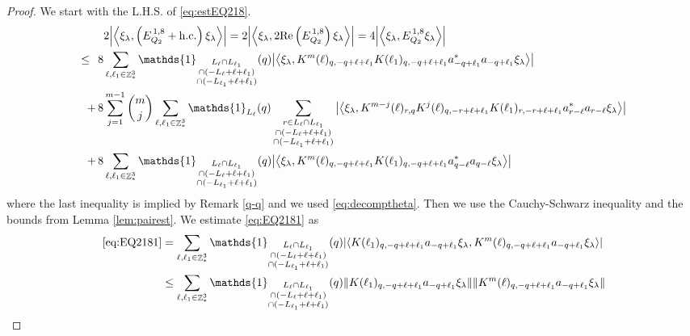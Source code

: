 \documentclass[12pt,a4paper]{article}
\numberwithin{equation}{section}
\newcommand{\1}{\mathbb{I}}
\DeclareMathOperator{\Z}{\mathbb{Z}}
\newcommand{\eva}[1]{\left\langle #1 \right\rangle}
\theoremstyle{plain}
\theoremstyle{definition}
\theoremstyle{remark}
\theoremstyle{plain}
\theoremstyle{definition}
\theoremstyle{remark}
\begin{document}
\begin{proof}
 We start with the L.H.S. of \eqref{eq:estEQ218}.
\begin{align}
	&2\abs{\eva{\xi_\lambda,\left(E^{\,1,8}_{Q_2}+\mathrm{h.c.}\right) \xi_\lambda }} = 2\abs{\eva{\xi_\lambda,2\mathrm{Re}\left(E^{\,1,8}_{Q_2}\right) \xi_\lambda }} = 4\abs{\eva{\xi_\lambda, E^{\,1,8}_{Q_2} \xi_\lambda }}\nonumber\\
	\leq\,\;8& \sum\limits_{\ell, \ell_1\in \Z^3_*} \mathds{1}_{\substack{L_{\ell}\cap L_{\ell_1}\\\cap (-L_{\ell}+\ell+\ell_1) \\ \cap (-L_{\ell_1}+\ell+\ell_1)}}(q) \abs{\eva{\xi_\lambda, K^m(\ell)_{q,-q+\ell+\ell_1} K(\ell_1)_{q,-q+\ell+\ell_1} a^*_{-q+\ell_1}a_{-q+\ell_1} \xi_\lambda }} \label{eq:EQ2181}\\
	+\,8& \sum\limits_{j=1}^{m-1} {{m}\choose j} \sum\limits_{\ell, \ell_1\in \Z^3_*}\mathds{1}_{L_{\ell}}(q) \sum\limits_{\substack{r\in L_{\ell} \cap L_{\ell_1}\\\cap (-L_{\ell}+\ell+\ell_1) \\ \cap (-L_{\ell_1}+\ell+\ell_1)}}  \abs{\eva{\xi_\lambda, K^{m-j}(\ell)_{r,q} K^j(\ell)_{q,-r+\ell+\ell_1} K(\ell_1)_{r,-r+\ell+\ell_1} a^*_{r-\ell}a_{r-\ell} \xi_\lambda }} \label{eq:EQ2182}\\
	+\,8&\sum\limits_{\ell, \ell_1\in \Z^3_*} \mathds{1}_{\substack{L_{\ell}\cap L_{\ell_1}\\\cap (-L_{\ell}+\ell+\ell_1) \\ \cap (-L_{\ell_1}+\ell+\ell_1)}} (q) \abs{\eva{\xi_\lambda, K^m(\ell)_{q,-q+\ell+\ell_1}K(\ell_1)_{q,-q+\ell+\ell_1} a^*_{q-\ell}a_{q-\ell}\xi_\lambda }} \label{eq:EQ2183}
\end{align}
where the last inequality is implied by Remark \ref{q-q} and we used \eqref{eq:decomptheta}. Then we use the Cauchy-Schwarz inequality and the bounds from Lemma \ref{lem:pairest}.
We estimate \eqref{eq:EQ2181} as 
\begin{align}
	 \eqref{eq:EQ2181}
	&= \sum\limits_{\ell, \ell_1\in \Z^3_*} \mathds{1}_{\substack{L_{\ell}\cap L_{\ell_1}\\\cap (-L_{\ell}+\ell+\ell_1) \\ \cap (-L_{\ell_1}+\ell+\ell_1)}}(q) \abs{\eva{ K(\ell_1)_{q,-q+\ell+\ell_1} a_{-q+\ell_1} \xi_\lambda, K^m(\ell)_{q,-q+\ell+\ell_1} a_{-q+\ell_1} \xi_\lambda }}\nonumber\\
	&\leq \sum\limits_{\ell, \ell_1\in \Z^3_*} \mathds{1}_{\substack{L_{\ell}\cap L_{\ell_1}\\\cap (-L_{\ell}+\ell+\ell_1) \\ \cap (-L_{\ell_1}+\ell+\ell_1)}}(q) \norm{ K(\ell_1)_{q,-q+\ell+\ell_1} a_{-q+\ell_1} \xi_\lambda}\norm{ K^m(\ell)_{q,-q+\ell+\ell_1} a_{-q+\ell_1} \xi_\lambda }\nonumber\\

\end{align}
\end{proof}
\end{document}
